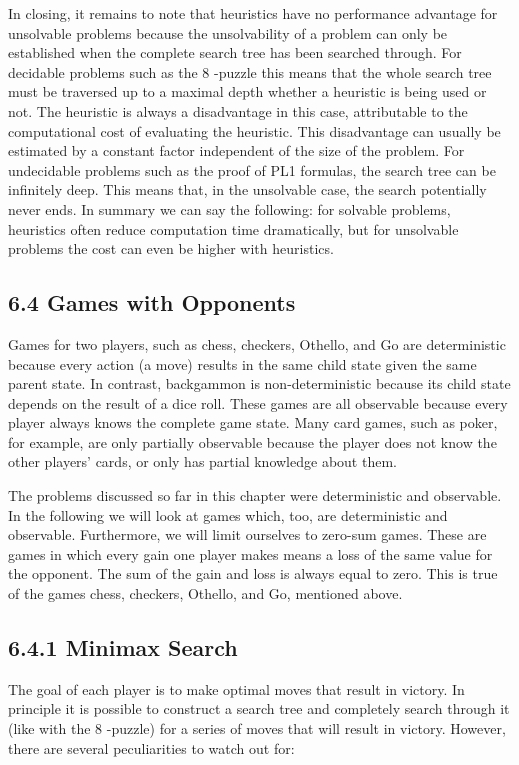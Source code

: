 \documentclass[10pt]{article}
\begin{document}
In closing, it remains to note that heuristics have no performance advantage for unsolvable problems because the unsolvability of a problem can only be established when the complete search tree has been searched through. For decidable problems such as the 8 -puzzle this means that the whole search tree must be traversed up to a maximal depth whether a heuristic is being used or not. The heuristic is always a disadvantage in this case, attributable to the computational cost of evaluating the heuristic. This disadvantage can usually be estimated by a constant factor independent of the size of the problem. For undecidable problems such as the proof of PL1 formulas, the search tree can be infinitely deep. This means that, in the unsolvable case, the search potentially never ends. In summary we can say the following: for solvable problems, heuristics often reduce computation time dramatically, but for unsolvable problems the cost can even be higher with heuristics.

\subsection*{6.4 Games with Opponents}
Games for two players, such as chess, checkers, Othello, and Go are deterministic because every action (a move) results in the same child state given the same parent state. In contrast, backgammon is non-deterministic because its child state depends on the result of a dice roll. These games are all observable because every player always knows the complete game state. Many card games, such as poker, for example, are only partially observable because the player does not know the other players' cards, or only has partial knowledge about them.


The problems discussed so far in this chapter were deterministic and observable. In the following we will look at games which, too, are deterministic and observable. Furthermore, we will limit ourselves to zero-sum games. These are games in which every gain one player makes means a loss of the same value for the opponent. The sum of the gain and loss is always equal to zero. This is true of the games chess, checkers, Othello, and Go, mentioned above.

\subsection*{6.4.1 Minimax Search}
The goal of each player is to make optimal moves that result in victory. In principle it is possible to construct a search tree and completely search through it (like with the 8 -puzzle) for a series of moves that will result in victory. However, there are several peculiarities to watch out for:
\end{document}
